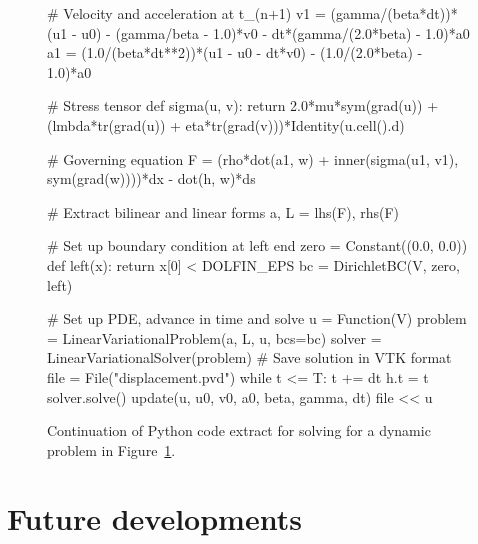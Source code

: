 \begin{figure}
\bwfig
\begin{python}
# Velocity and acceleration at t_(n+1)
v1 = (gamma/(beta*dt))*(u1 - u0) - (gamma/beta - 1.0)*v0 - dt*(gamma/(2.0*beta) - 1.0)*a0
a1 = (1.0/(beta*dt**2))*(u1 - u0 - dt*v0) - (1.0/(2.0*beta) - 1.0)*a0

# Stress tensor
def sigma(u, v):
    return 2.0*mu*sym(grad(u)) + (lmbda*tr(grad(u)) + eta*tr(grad(v)))*Identity(u.cell().d)

# Governing equation
F = (rho*dot(a1, w) + inner(sigma(u1, v1), sym(grad(w))))*dx - dot(h, w)*ds

# Extract bilinear and linear forms
a, L = lhs(F), rhs(F)

# Set up boundary condition at left end
zero = Constant((0.0, 0.0))
def left(x):
    return x[0] < DOLFIN_EPS
bc = DirichletBC(V, zero, left)

# Set up PDE, advance in time and solve
u = Function(V)
problem = LinearVariationalProblem(a, L, u, bcs=bc)
solver = LinearVariationalSolver(problem)
# Save solution in VTK format
file = File("displacement.pvd")
while t <= T:
    t += dt
    h.t = t
    solver.solve()
    update(u, u0, v0, a0, beta, gamma, dt)
    file << u
\end{python}
\caption{Continuation of Python code extract for solving for a dynamic
problem in Figure~\ref{fig:oelgaard-1:time_ufl_code2}.}
\label{fig:oelgaard-1:time_ufl_code2}
\end{figure}

\section{Future developments}

